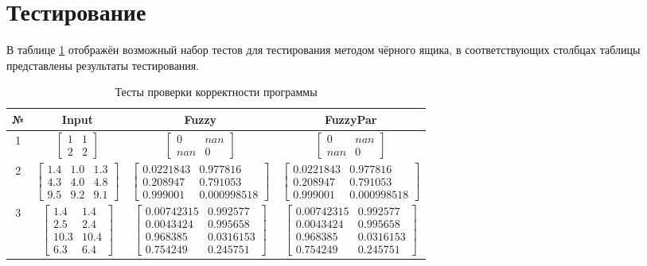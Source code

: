     \section{Тестирование}
        В таблице \ref{table:testing} отображён возможный набор тестов
        для тестирования методом чёрного ящика, в соответствующих столбцах таблицы представлены результаты тестирования.
        \begin{table}[h!]
            \caption{Тесты проверки корректности программы}
            \centering
            \begin{tabular}{|c|c|c|c|}
            \hline
            № & Input & Fuzzy & FuzzyPar \\\hline
            1 & $\begin{bmatrix} 1 & 1 \\ 2 & 2 \end{bmatrix}$ & $\begin{bmatrix} 0 & nan \\ nan & 0 \end{bmatrix}$ & $\begin{bmatrix} 0 & nan \\ nan & 0 \end{bmatrix}$  \\ \hline
            2 & $\begin{bmatrix} 1.4 & 1.0 & 1.3 \\ 4.3 & 4.0 & 4.8 \\ 9.5 & 9.2 & 9.1 \end{bmatrix}$ & 
            $\begin{bmatrix} 0.0221843 & 0.977816 \\
0.208947 & 0.791053 \\
0.999001 & 0.000998518 \end{bmatrix}$  & $\begin{bmatrix} 0.0221843 & 0.977816 \\
0.208947 & 0.791053 \\
0.999001 & 0.000998518 \end{bmatrix}$  \\ \hline
            3 & $\begin{bmatrix} 1.4 & 1.4 \\ 2.5 & 2.4 \\ 10.3 & 10.4 \\ 6.3 & 6.4 \end{bmatrix}$ & $\begin{bmatrix} 0.00742315 & 0.992577 \\ 
0.0043424 & 0.995658 \\
0.968385 & 0.0316153 \\
0.754249 & 0.245751  \end{bmatrix}$ & $\begin{bmatrix} 0.00742315 & 0.992577 \\ 
0.0043424 & 0.995658 \\
0.968385 & 0.0316153 \\
0.754249 & 0.245751  \end{bmatrix}$ \\ \hline
            \end{tabular}
            \label{table:testing}
        \end{table}

